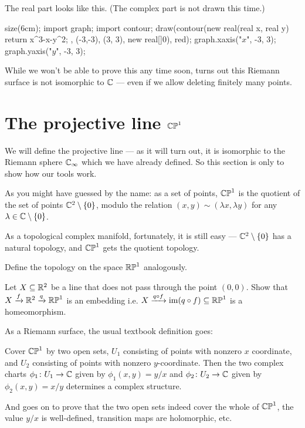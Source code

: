 \begin{example}[The elliptic curve $y^2 = x^3 - x$]
	The real part looks like this. (The complex part is not drawn this time.)
	\begin{center}
		\begin{asy}
			size(6cm);
			import graph;
			import contour;
			draw(contour(new real(real x, real y){ return x^3-x-y^2; }, (-3,-3), (3, 3),  new real[]{0}), red);
			graph.xaxis("$x$", -3, 3);
			graph.yaxis("$y$", -3, 3);
		\end{asy}
	\end{center}

	While we won't be able to prove this any time soon, turns out this Riemann surface is not
	isomorphic to $\mathbb C$ --- even if we allow deleting finitely many points.
\end{example}

\section{The projective line $\mathbb{CP}^1$}
We will define the projective line --- as it will turn out, it is isomorphic to the Riemann sphere
$\mathbb C_\infty$ which we have already defined. So this section is only to show how our tools work.

As you might have guessed by the name: as a set of points, $\mathbb{CP}^1$ is the quotient of the set of
points $\mathbb C^2 \setminus \{ 0 \}$, modulo the relation $(x, y) \sim (\lambda x, \lambda y)$ for
any $\lambda \in \mathbb C \setminus \{ 0 \}$.

As a topological complex manifold, fortunately, it is still easy --- $\mathbb C^2 \setminus \{ 0 \}$
has a natural topology, and $\mathbb{CP}^1$ gets the quotient topology.
\begin{exercise}
	Define the topology on the space $\mathbb{RP}^1$ analogously.
\end{exercise}
\begin{exercise}
	Let $X \subseteq \mathbb R^2$ be a line that does not pass through the point $(0, 0)$.
	Show that $X \xrightarrow{f} \mathbb R^2 \xrightarrow{q} \mathbb{RP}^1$ is an embedding i.e.
	$X \xrightarrow{q \circ f} \operatorname{im}(q \circ f) \subseteq \mathbb{RP}^1$ is a homeomorphism.
\end{exercise}

As a Riemann surface, the usual textbook definition goes:
\begin{definition}
	Cover $\mathbb{CP}^1$ by two open sets, $U_1$ consisting of points with nonzero $x$ coordinate,
	and $U_2$ consisting of points with nonzero $y$-coordinate.
	Then the two complex charts $\phi_1 \colon U_1 \to \mathbb C$ given by $\phi_1(x, y) = y/x$
	and $\phi_2 \colon U_2 \to \mathbb C$ given by $\phi_2(x, y) = x/y$
	determines a complex structure.
\end{definition}
And goes on to prove that the two open sets indeed cover the whole of $\mathbb{CP}^1$,
the value $y/x$ is well-defined, transition maps are holomorphic, etc.

